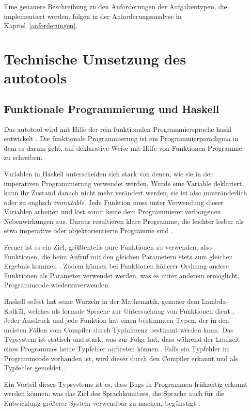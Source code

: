 Eine genauere Beschreibung zu den Anforderungen der Aufgabentypen, die implementiert werden, folgen in der Anforderungsanalyse in Kapitel~\ref{anforderungen}.

\section{Technische Umsetzung des autotools}\label{autotoolTe}
\subsection{Funktionale Programmierung und Haskell}
Das autotool wird mit Hilfe der rein funktionalen Programmiersprache \gls{haskl} entwickelt \cite[ch.~1]{HasLangRep}. Die funktionale Programmierung ist ein Programmierparadigma in dem es darum geht, auf deklarative Weise mit Hilfe von Funktionen Programme zu schreiben. 

Variablen in Haskell unterscheiden sich stark von denen, wie sie in der imperativen Programmierung verwendet werden. Wurde eine Variable deklariert, kann ihr Zustand danach nicht mehr verändert werden, sie ist also unveränderlich oder zu englisch \textit{immutable}. Jede Funktion muss unter Verwendung dieser Variablen arbeiten und löst somit keine dem Programmierer verborgenen Nebenwirkungen aus. Daraus resultieren klare Programme, die leichter lesbar als etwa imperative oder objektorientierte Programme sind \cite{HAfuncprog}. 

Ferner ist es ein Ziel, größtenteils pure Funktionen zu verwenden, also Funktionen, die beim Aufruf mit den gleichen Parametern stets zum gleichen Ergebnis kommen \cite[ch.~1]{HArealw}. Zudem können bei Funktionen höherer Ordnung andere Funktionen als Parameter verwendet werden, was es unter anderem ermöglicht, Programmcode wiederzuverwenden.

Haskell selbst hat seine Wurzeln in der Mathematik, genauer dem Lambda-Kalkül, welches als formale Sprache zur Untersuchung von Funktionen dient \cite[S.~111]{lambda}. Jeder Ausdruck und jede Funktion hat einen bestimmten Typen, der in den meisten Fällen vom Compiler durch Typinferenz bestimmt werden kann. Das Typsystem ist statisch und stark, was zur Folge hat, dass während der Laufzeit eines Programmes keine Typfehler auftreten können \cite[ch.~2]{HArealw}. Falls ein Typfehler im Programmcode vorhanden ist, wird dieser durch den Compiler erkannt und als Typfehler gemeldet \cite[ch.~1]{HArealw}.

Ein Vorteil dieses Typsystems ist es, dass Bugs in Programmen frühzeitig erkannt werden können, was das Ziel des Sprachkomitees, die Sprache auch für die Entwicklung größerer System verwendbar zu machen, begünstigt \cite[Preface]{HasLangRep}. 

